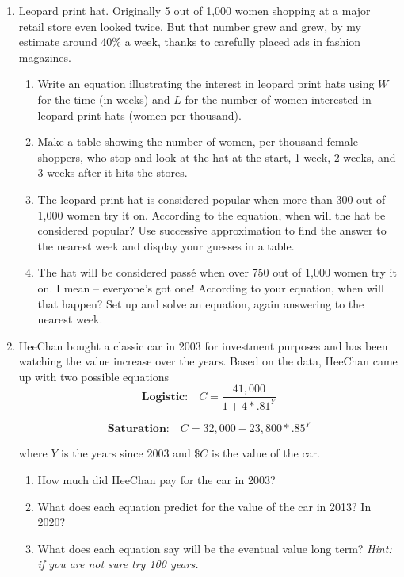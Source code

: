 \begin{enumerate} 

\item Leopard print hat. Originally 5 out of 1,000 women shopping at a major retail store even looked twice.  But that number grew and grew, by my estimate around 40\% a week, thanks to carefully placed ads in fashion magazines.
\begin{enumerate}
\item Write an equation illustrating the interest in leopard print hats using $W$ for the time (in weeks) and $L$ for the number of women interested in leopard print hats (women per thousand). 
\vfill
\item Make a table showing the number of women, per thousand female shoppers, who stop and look at the hat at the start, 1 week, 2 weeks, and 3 weeks after it hits the stores. 
\vfill
\item The leopard print hat is considered popular when more than 300 out of 1,000 women try it on.  According to the equation, when will the hat be considered popular?  Use successive approximation to find the answer to the nearest week and display your guesses in a table. 
\vfill
\vfill
\item The hat will be considered pass\'e when over 750 out of 1,000 women try it on.  I mean -- everyone's got one!  According to your equation, when will that happen?  Set up and solve an equation, again answering to the nearest week. 
\vfill
\vfill
\end{enumerate} 

\newpage

\item HeeChan bought a classic car in 2003 for investment purposes and has been watching the value increase over the years.  Based on the data, HeeChan came up with two possible equations
$$\textbf{Logistic:} \quad C= \frac{41,000}{1+4\ast.81^Y}$$

$$ \textbf{Saturation:} \quad C = 32,000-23,800\ast.85^Y$$

where $Y$ is the years since 2003 and \$$C$ is the value of the car.

\begin{enumerate}
\item How much did HeeChan pay for the car in 2003? 
\vfill
\item What does each equation predict for the value of the car in 2013?  In 2020?   
\vfill
\item What does each equation say will be the eventual value long term?  \emph{Hint:   if you are not sure try 100 years.}  
\vfill
\end{enumerate} 


\end{enumerate}
